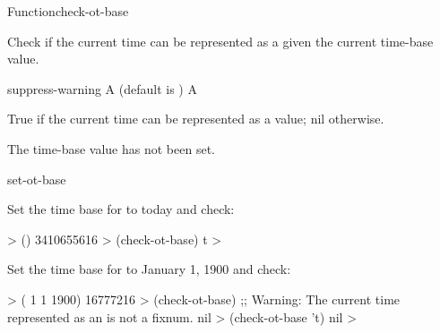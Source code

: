 \documentclass[10pt,twoside,english,pdftex]{article}
\begin{document}
\begin{functiondoc}{Function}{check-ot-base}{%
    }

%

\fnsyntax

\fnpurpose Check if the current time can be represented as a
 given the current  time-base
value.

\fnpackage {}

\fnmodule {}

\fnargs
\begin{args}{suppress-warning}
 A  (default is \nil)
\arg[boolean] A 
\end{args}

\fnreturns True if the current time can be represented as a
  value; nil otherwise.

\fnerrors The  time-base value has not been set.

\begin{alsos}{set-ot-base}
\also[*ot-base*]
\also[ot2ut]
\also[ut2ot]
\end{alsos}

\fnexamples
Set the time base for  to today and check:
%
\W\supp
\begin{example}
  > ()
  3410655616
  > (check-ot-base)
  t
  >
\end{example}
%
Set the time base for  to January 1, 1900 and check:
%
\W\supp\notpretop
\begin{example}
  > ( 1 1 1900)
  16777216
  > (check-ot-base)
  ;; Warning: The current time represented as an  is not a fixnum.
  nil
  > (check-ot-base 't)
  nil
  >
\end{example}

\end{functiondoc}

\end{document}
